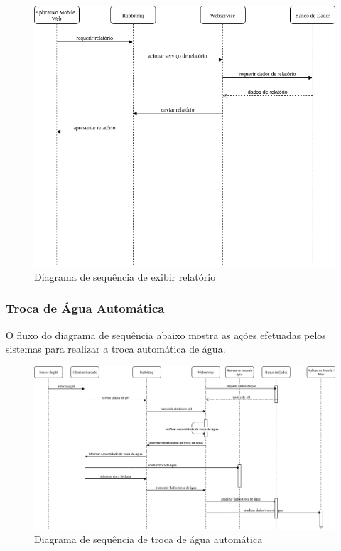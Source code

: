 \begin{figure}[H]
	\centering
	\includegraphics[width=18cm]{figuras/exibir_relatorio.png}
	\caption{Diagrama de sequência de exibir relatório} \label{exibir_relatorio}
\end{figure}

\subsubsection{Troca de Água Automática}

O fluxo do diagrama de sequência abaixo mostra as ações efetuadas pelos sistemas para realizar a troca automática de água.

\begin{figure}[H]
	\centering
	\includegraphics[width=17cm]{figuras/troca_agua.png}
	\caption{Diagrama de sequência de troca de água automática} \label{troca_agua}
\end{figure}

